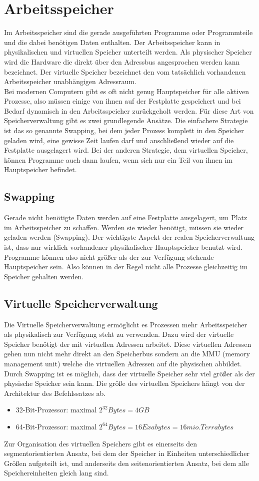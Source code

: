 \section{Arbeitsspeicher}
Im Arbeitsspeicher sind die gerade ausgeführten Programme oder Programmteile und die dabei benötigen Daten enthalten. Der Arbeitsspeicher kann in physikalischen und virtuellen Speicher unterteilt werden. Als physischer Speicher wird die Hardware die direkt über den Adressbus angesprochen werden kann bezeichnet. Der virtuelle Speicher bezeichnet den vom tatsächlich vorhandenen Arbeitsspeicher unabhängigen Adressraum.\\[3mm]
Bei modernen Computern gibt es oft nicht genug Hauptspeicher für alle
aktiven Prozesse, also müssen einige von ihnen auf der Festplatte gespeichert
und bei Bedarf dynamisch in den Arbeitsspeicher zurückgeholt werden. Für diese Art
von Speicherverwaltung gibt es zwei grundlegende Ansätze. Die einfachere
Strategie ist das so genannte Swapping, bei dem jeder Prozess komplett in den
Speicher geladen wird, eine gewisse Zeit laufen darf und anschließend wieder auf
die Festplatte ausgelagert wird. Bei der anderen Strategie, dem virtuellen
Speicher, können Programme auch dann laufen, wenn sich nur ein Teil von
ihnen im Hauptspeicher befindet. 
\subsection{Swapping}
Gerade nicht benötigte Daten werden auf eine Festplatte ausgelagert, um Platz im Arbeitsspeicher zu schaffen. Werden sie wieder benötigt, müssen sie wieder geladen werden (Swapping). Der wichtigste Aspekt der realen Speicherverwaltung ist, dass nur wirklich
vorhandener physikalischer Hauptspeicher benutzt wird. Programme können also
nicht größer als der zur Verfügung stehende Hauptspeicher sein. Also können in
der Regel nicht alle Prozesse gleichzeitig im Speicher gehalten werden. 
\subsection{Virtuelle Speicherverwaltung}
Die Virtuelle Speicherverwaltung ermöglicht es Prozessen mehr Arbeitsspeicher als physikalisch zur Verfügung steht zu verwenden. Dazu wird der virtuelle Speicher benötigt der mit virtuellen Adressen arbeitet. Diese virtuellen Adressen gehen nun nicht mehr direkt an den Speicherbus sondern an die MMU (memory management unit) welche die virtuellen Adressen auf die physischen abbildet. Durch Swapping ist es möglich, dass der virtuelle Speicher sehr viel größer als der physische Speicher sein kann. Die größe des virtuellen Speichers hängt von der Architektur des Befehlssatzes ab.
\begin{itemize}
	\item 32-Bit-Prozessor: maximal $2^{32} Bytes = 4 GB$
	\item 64-Bit-Prozessor: maximal $2^{64} Bytes= 16 Exabytes = 16 mio. Terrabytes $
\end{itemize}   
Zur Organisation des virtuellen Speichers gibt es einerseits den
segmentorientierten Ansatz, bei dem der Speicher in Einheiten unterschiedlicher
Größen aufgeteilt ist, und anderseits den seitenorientierten Ansatz, bei dem alle
Speichereinheiten gleich lang sind.
